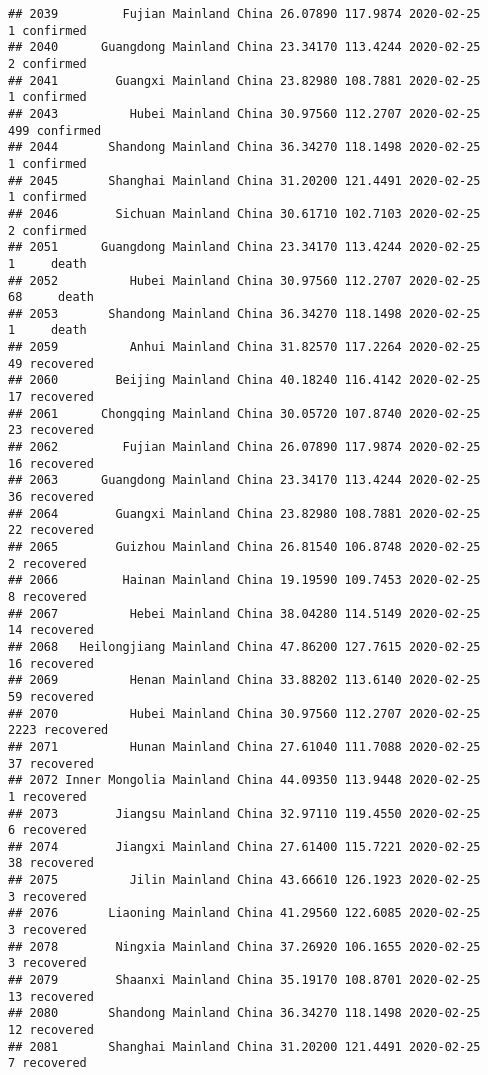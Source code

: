 \documentclass[
]{article}
\begin{document}
\begin{verbatim}
## 2039         Fujian Mainland China 26.07890 117.9874 2020-02-25     1 confirmed
## 2040      Guangdong Mainland China 23.34170 113.4244 2020-02-25     2 confirmed
## 2041        Guangxi Mainland China 23.82980 108.7881 2020-02-25     1 confirmed
## 2043          Hubei Mainland China 30.97560 112.2707 2020-02-25   499 confirmed
## 2044       Shandong Mainland China 36.34270 118.1498 2020-02-25     1 confirmed
## 2045       Shanghai Mainland China 31.20200 121.4491 2020-02-25     1 confirmed
## 2046        Sichuan Mainland China 30.61710 102.7103 2020-02-25     2 confirmed
## 2051      Guangdong Mainland China 23.34170 113.4244 2020-02-25     1     death
## 2052          Hubei Mainland China 30.97560 112.2707 2020-02-25    68     death
## 2053       Shandong Mainland China 36.34270 118.1498 2020-02-25     1     death
## 2059          Anhui Mainland China 31.82570 117.2264 2020-02-25    49 recovered
## 2060        Beijing Mainland China 40.18240 116.4142 2020-02-25    17 recovered
## 2061      Chongqing Mainland China 30.05720 107.8740 2020-02-25    23 recovered
## 2062         Fujian Mainland China 26.07890 117.9874 2020-02-25    16 recovered
## 2063      Guangdong Mainland China 23.34170 113.4244 2020-02-25    36 recovered
## 2064        Guangxi Mainland China 23.82980 108.7881 2020-02-25    22 recovered
## 2065        Guizhou Mainland China 26.81540 106.8748 2020-02-25     2 recovered
## 2066         Hainan Mainland China 19.19590 109.7453 2020-02-25     8 recovered
## 2067          Hebei Mainland China 38.04280 114.5149 2020-02-25    14 recovered
## 2068   Heilongjiang Mainland China 47.86200 127.7615 2020-02-25    16 recovered
## 2069          Henan Mainland China 33.88202 113.6140 2020-02-25    59 recovered
## 2070          Hubei Mainland China 30.97560 112.2707 2020-02-25  2223 recovered
## 2071          Hunan Mainland China 27.61040 111.7088 2020-02-25    37 recovered
## 2072 Inner Mongolia Mainland China 44.09350 113.9448 2020-02-25     1 recovered
## 2073        Jiangsu Mainland China 32.97110 119.4550 2020-02-25     6 recovered
## 2074        Jiangxi Mainland China 27.61400 115.7221 2020-02-25    38 recovered
## 2075          Jilin Mainland China 43.66610 126.1923 2020-02-25     3 recovered
## 2076       Liaoning Mainland China 41.29560 122.6085 2020-02-25     3 recovered
## 2078        Ningxia Mainland China 37.26920 106.1655 2020-02-25     3 recovered
## 2079        Shaanxi Mainland China 35.19170 108.8701 2020-02-25    13 recovered
## 2080       Shandong Mainland China 36.34270 118.1498 2020-02-25    12 recovered
## 2081       Shanghai Mainland China 31.20200 121.4491 2020-02-25     7 recovered

\end{verbatim}
\end{document}
